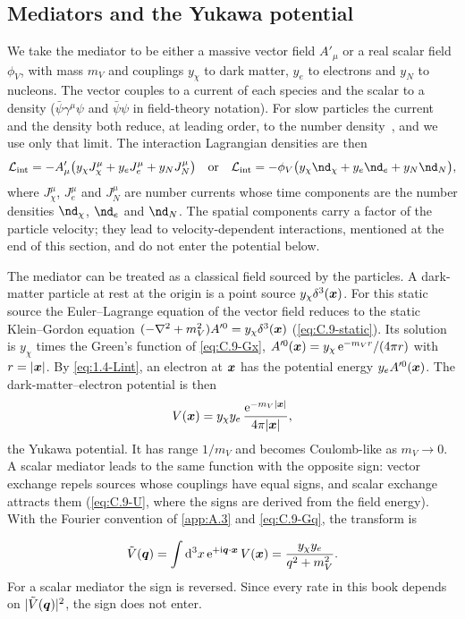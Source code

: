\subsection{Mediators and the Yukawa potential}

We take the mediator to be either a massive vector field $A'_\mu$ or a real scalar field $\phi_V$, with mass $m_V$ and couplings $y_\chi$ to dark matter, $y_e$ to electrons and $y_N$ to nucleons. The vector couples to a current of each species and the scalar to a density ($\bar\psi\gamma^\mu\psi$ and $\bar\psi\psi$ in field-theory notation). For slow particles the current and the density both reduce, at leading order, to the number density~\cite[Eq.~(7)]{knapen2021dark}, and we use only that limit. The interaction Lagrangian densities are then
\begin{equation}
  \mathcal{L}_{\mathrm{int}} = -A'_\mu\bigl(y_\chi J^\mu_\chi + y_e J^\mu_e + y_N J^\mu_N\bigr)
  \quad\text{or}\quad
  \mathcal{L}_{\mathrm{int}} = -\phi_V\bigl(y_\chi \nd_\chi + y_e \nd_e + y_N \nd_N\bigr),
  \label{eq:1.4-Lint}
\end{equation}
where $J^\mu_\chi$, $J^\mu_e$ and $J^\mu_N$ are number currents whose time components are the number densities $\nd_\chi$, $\nd_e$ and $\nd_N$. The spatial components carry a factor of the particle velocity; they lead to velocity-dependent interactions, mentioned at the end of this section, and do not enter the potential below.

The mediator can be treated as a classical field sourced by the particles. A dark-matter particle at rest at the origin is a point source $y_\chi\delta^3(\bm{x})$. For this static source the Euler--Lagrange equation of the vector field reduces to the static Klein--Gordon equation $(-\nabla^2 + m_V^2)A'^0 = y_\chi\delta^3(\bm{x})$ (\cref{eq:C.9-static}). Its solution is $y_\chi$ times the Green's function of \cref{eq:C.9-Gx}, $A'^0(\bm{x}) = y_\chi\,\mathrm{e}^{-m_V r}/(4\pi r)$ with $r = |\bm{x}|$. By \cref{eq:1.4-Lint}, an electron at $\bm{x}$ has the potential energy $y_e A'^0(\bm{x})$. The dark-matter--electron potential is then
\begin{equation}
  V(\bm{x}) = y_\chi y_e\,\frac{\mathrm{e}^{-m_V|\bm{x}|}}{4\pi|\bm{x}|},
  \label{eq:1.4-yukawa}
\end{equation}
the Yukawa potential. It has range $1/m_V$ and becomes Coulomb-like as $m_V \to 0$. A scalar mediator leads to the same function with the opposite sign: vector exchange repels sources whose couplings have equal signs, and scalar exchange attracts them (\cref{eq:C.9-U}, where the signs are derived from the field energy). With the Fourier convention of \cref{app:A.3} and \cref{eq:C.9-Gq}, the transform is
\begin{keyresult}
\begin{equation}
  \tilde V(\bm{q}) = \int\mathrm{d}^3x\,\mathrm{e}^{+\mathrm{i}\bm{q}\cdot\bm{x}}\,V(\bm{x}) = \frac{y_\chi y_e}{q^2 + m_V^2}.
  \label{eq:1.4-Vq}
\end{equation}
For a scalar mediator the sign is reversed. Since every rate in this book depends on $|\tilde V(\bm{q})|^2$, the sign does not enter.
\end{keyresult}

